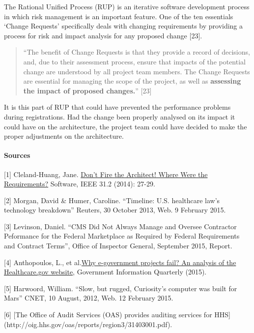 \documentclass[]{article}
\let\oldparagraph\paragraph
\renewcommand{\paragraph}[1]{\oldparagraph{#1}\mbox{}}
\begin{document}
The Rational Unified Process (RUP) is an iterative software development
process in which risk management is an important feature. One of the ten
essentials `Change Requests' specifically deals with changing
requirements by providing a process for risk and impact analysis for any
proposed change {[}23{]}.

\begin{quote}
``The benefit of Change Requests is that they provide a record of
decisions, and, due to their assessment process, ensure that impacts of
the potential change are understood by all project team members. The
Change Requests are essential for managing the scope of the project, as
well as \textbf{assessing the impact of proposed changes.}'' {[}23{]}
\end{quote}

It is this part of RUP that could have prevented the performance
problems during registrations. Had the change been properly analysed on
its impact it could have on the architecture, the project team could
have decided to make the proper adjustments on the architecture.

\paragraph{Sources}\label{sources}

{[}1{]} Cleland-Huang, Jane.
\href{http://ieeexplore.ieee.org/stamp/stamp.jsp?tp=\&arnumber=6774318}{Don't
Fire the Architect! Where Were the Requirements?} Software, IEEE 31.2
(2014): 27-29.

{[}2{]} Morgan, David \& Humer, Caroline. ``Timeline: U.S. healthcare
law's technology breakdown'' Reuters, 30 October 2013, Web. 9 February
2015.

{[}3{]} Levinson, Daniel. ``CMS Did Not Always Manage and Oversee
Contractor Peformance for the Federal Marketplace as Required by Federal
Requirements and Contract Terms'', Office of Inspector General,
September 2015, Report.

{[}4{]} Anthopoulos, L., et
al.\href{http://www.sciencedirect.com/science/article/pii/S0740624X15000799}{Why
e-government projects fail? An analysis of the Healthcare.gov website},
Government Information Quarterly (2015).

{[}5{]} Harwoord, William. ``Slow, but rugged, Curiosity's computer was
built for Mars'' CNET, 10 August, 2012, Web. 12 February 2015.

{[}6{]} {[}The Office of Audit Services (OAS) provides auditing services
for HHS{]}(http://oig.hhs.gov/oas/reports/region3/31403001.pdf).
\end{document}
